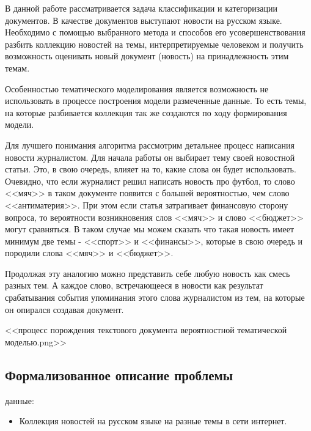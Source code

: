 В данной работе рассматривается задача \todo{}классификации и категоризации документов. В качестве документов выступают новости на русском языке. Необходимо с помощью выбранного метода и способов его усовершенствования разбить коллекцию новостей на темы, интерпретируемые человеком и получить возможность оценивать новый документ (новость) на принадлежность этим темам.

Особенностью тематического моделирования является возможность не использовать в процессе построения модели размеченные данные. То есть темы, на которые разбивается коллекция так же создаются по ходу формирования модели. 

Для лучшего понимания алгоритма рассмотрим детальнее процесс написания новости журналистом. Для начала работы он выбирает тему своей новостной статьи. Это, в свою очередь, влияет на то, какие слова он будет использовать. Очевидно, что если журналист решил написать новость про футбол, то слово <<мяч>> в таком документе появится с большей вероятностью, чем слово <<антиматерия>>. При этом если статья затрагивает финансовую сторону вопроса, то вероятности возникновения слов <<мяч>> и слово <<бюджет>> могут сравняться. В таком случае мы можем сказать что такая новость имеет минимум две темы - <<спорт>> и <<финансы>>, которые в свою очередь и породили слова <<мяч>> и <<бюджет>>. 

Продолжая эту аналогию можно представить себе любую новость как смесь разных тем. А каждое слово, встречающееся в новости как результат срабатывания события упоминания этого слова журналистом из тем, на которые он опирался создавая документ.

<<процесс порождения текстового документа вероятностной тематической моделью.png>>

\subsection{Формализованное описание проблемы}

 данные:

\begin{itemize}
    \item Коллекция новостей на русском языке на разные темы в сети интернет.
\end{itemize}

